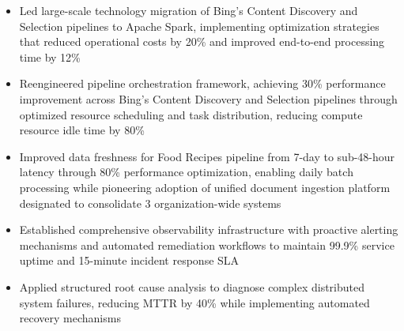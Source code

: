 \begin{itemize}
    \item \small{Led large-scale technology migration of Bing's Content Discovery and Selection pipelines to Apache Spark, implementing optimization strategies that reduced operational costs by 20\% and improved end-to-end processing time by 12\%}

    \item \small{Reengineered pipeline orchestration framework, achieving 30\% performance improvement across Bing's Content Discovery and Selection pipelines through optimized resource scheduling and task distribution, reducing compute resource idle time by 80\%}

    \item \small{Improved data freshness for Food Recipes pipeline from 7-day to sub-48-hour latency through 80\% performance optimization, enabling daily batch processing while pioneering adoption of unified document ingestion platform designated to consolidate 3 organization-wide systems}

    \item \small{Established comprehensive observability infrastructure with proactive alerting mechanisms and automated remediation workflows to maintain 99.9\% service uptime and 15-minute incident response SLA}

    \item \small{
        Applied structured root cause analysis to diagnose complex distributed system failures, reducing MTTR by 40\% while implementing automated recovery mechanisms
    }


\end{itemize}
